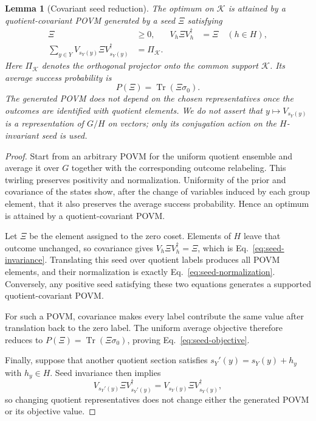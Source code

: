 \documentclass[11pt]{article}
\newcommand{\Tr}{\operatorname{Tr}}
\newcommand{\1}{\mathbf 1}
\theoremstyle{plain}
\newtheorem{lemma}[theorem]{Lemma}
\theoremstyle{definition}
\theoremstyle{remark}
\begin{document}
\begin{lemma}[Covariant seed reduction]
\label{lem:covariant-seed-reduction}
The optimum on $\mathcal K$ is attained by a quotient-covariant POVM generated
by a seed $\Xi$ satisfying
\begin{align}
 \Xi&\ge0,
 &V_h\Xi V_h^\dagger&=\Xi\quad(h\in H),
 \label{eq:seed-invariance}\\
 \sum_{y\in Y}V_{s_Y(y)}\Xi V_{s_Y(y)}^\dagger
 &=\Pi_{\mathcal K}.
 \label{eq:seed-normalization}
\end{align}
Here $\Pi_{\mathcal K}$ denotes the orthogonal projector onto the common
support $\mathcal K$.  Its average success probability is
\begin{equation}
 P(\Xi)=\Tr(\Xi\sigma_0).
 \label{eq:seed-objective}
\end{equation}
The generated POVM does not depend on the chosen representatives once the
outcomes are identified with quotient elements.  We do not assert that
$y\mapsto V_{s_Y(y)}$ is a representation of $G/H$ on vectors; only its
conjugation action on the $H$-invariant seed is used.
\end{lemma}
\begin{proof}
Start from an arbitrary POVM for the uniform quotient ensemble and average it
over $G$ together with the corresponding outcome relabeling.  This twirling
preserves positivity and normalization.  Uniformity of the prior and
covariance of the states show, after the change of variables induced by each
group element, that it also preserves the average success probability.
Hence an optimum is attained by a quotient-covariant POVM.

Let $\Xi$ be the element assigned to the zero coset.  Elements of $H$ leave
that outcome unchanged, so covariance gives
$V_h\Xi V_h^\dagger=\Xi$, which is
Eq.~\eqref{eq:seed-invariance}.  Translating this seed over quotient labels
produces all POVM elements, and their normalization is exactly
Eq.~\eqref{eq:seed-normalization}.  Conversely, any positive seed satisfying
these two equations generates a supported quotient-covariant POVM.

For such a POVM, covariance makes every label contribute the same value after
translation back to the zero label.  The uniform average objective therefore
reduces to
$P(\Xi)=\Tr(\Xi\sigma_0)$, proving
Eq.~\eqref{eq:seed-objective}.

Finally, suppose that another quotient section satisfies
$s_Y'(y)=s_Y(y)+h_y$ with $h_y\in H$.  Seed invariance then implies
\[
 V_{s_Y'(y)}\Xi V_{s_Y'(y)}^\dagger
 =V_{s_Y(y)}\Xi V_{s_Y(y)}^\dagger,
\]
so changing quotient representatives does not change either the generated
POVM or its objective value.
\end{proof}
\end{document}
